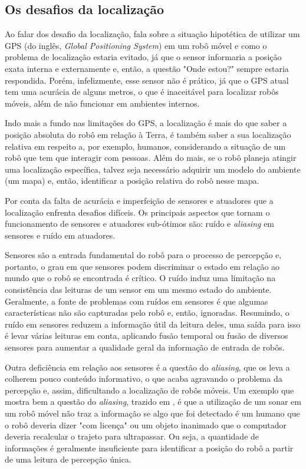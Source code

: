 \documentclass[acronym, symbols]{fei}
\begin{document}
		\subsection{Os desafios da localização}
		
			Ao falar dos desafio da localização, \textcite{siegwart2011introduction} fala sobre a situação hipotética de utilizar um GPS (do inglês, \textit{Global Positioning System}) em um robô móvel e como o problema de localização estaria evitado, já que o sensor informaria a posição exata interna e externamente e, então, a questão "Onde estou?" sempre estaria respondida. Porém, infelizmente, esse sensor não é prático, já que o GPS atual tem uma acurácia de alguns metros, o que é inaceitável para localizar robôs móveis, além de não funcionar em ambientes internos. 
			
			Indo mais a fundo nas limitações do GPS, a localização é mais do que saber a posição absoluta do robô em relação à Terra, é também saber a sua localização relativa em respeito a, por exemplo, humanos, considerando a situação de um robô que tem que interagir com pessoas. Além do mais, se o robô planeja atingir uma localização específica, talvez seja necessário adquirir um modelo do ambiente (um mapa) e, então, identificar a posição relativa do robô nesse mapa. 
			
			Por conta da falta de acurácia e imperfeição de sensores e atuadores que a localização enfrenta desafios difíceis. Os principais aspectos que tornam o funcionamento de sensores e atuadores sub-ótimos são: ruído e \textit{aliasing} em sensores e ruído em atuadores.
			
			Sensores são a entrada fundamental do robô para o processo de percepção	e, portanto, o grau em que sensores podem discriminar o estado em relação ao mundo que o robô se encontrada é crítico. O ruído induz uma limitação na consistência das leituras de um sensor em um mesmo estado do ambiente. Geralmente, a fonte de problemas com ruídos em sensores é que algumas características não são capturadas pelo robô e, então, ignoradas. Resumindo, o ruído em sensores reduzem a informação útil da leitura deles, uma saída para isso é levar várias leituras em conta, aplicando fusão temporal ou fusão de diversos sensores para aumentar a qualidade geral da informação de entrada de robôs.
			
			Outra deficiência em relação aos sensores é a questão do \textit{aliasing}, que os leva a colherem pouco conteúdo informativo, o que acaba agravando o problema da percepção e, assim, dificultando a localização de robôs móveis. Um exemplo que mostra bem a questão do \textit{aliasing}, trazido em \textcite{siegwart2011introduction}, é que a utilização de um sonar em um robô móvel não traz a informação se algo que foi detectado é um humano que o robô deveria dizer "com licença" ou um objeto inanimado que o computador deveria recalcular o trajeto para ultrapassar. Ou seja, a quantidade de informações é geralmente insuficiente para identificar a posição do robô a partir de uma leitura de percepção única.
			
\end{document}

